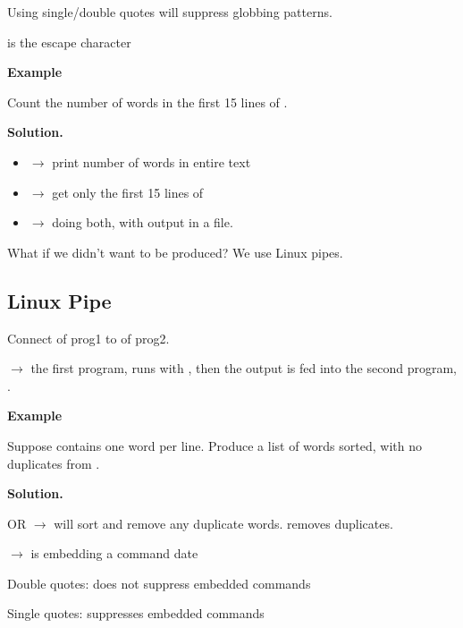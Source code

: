 Using single/double quotes will suppress globbing patterns.

\code{\textbackslash} is the escape character

\textbf{Example}

Count the number of words in the first 15 lines of .

\textbf{Solution.}

\begin{itemize}
      \item {} $ \rightarrow $ print number of words in entire text
      \item {} $ \rightarrow $ get only the first 15 lines
            of 
      \item {} $ \rightarrow $
            doing both, with output in a  file.
\end{itemize}

What if we didn't want  to be produced? We use Linux pipes.

\subsection{Linux Pipe}
Connect  of prog1 to  of prog2.

 $ \rightarrow $
the first program,  runs with , then the output is fed into
the second program, .

\textbf{Example}

Suppose  contains one word per line. Produce
a list of words sorted, with no duplicates from .

\textbf{Solution.}

 OR
 $ \rightarrow $  will sort
and remove any duplicate words.  removes duplicates.

 $ \rightarrow $
 is embedding a command date

Double quotes: does not suppress embedded commands

Single quotes: suppresses embedded commands
